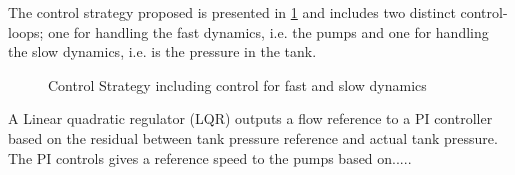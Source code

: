 The control strategy proposed is presented in \cref{fig:tikzControlStrat} and includes two distinct control-loops; one for handling the fast dynamics, i.e. the pumps and one for handling the slow dynamics, i.e. is the pressure in the tank.  
\begin{figure}[h!]
	\centering
	\resizebox{\columnwidth}{!}{
	}
	\caption{Control Strategy including control for fast and slow dynamics}
	\label{fig:tikzControlStrat}
\end{figure}
A Linear quadratic regulator (LQR) outputs a flow reference to a PI controller based on the residual between tank pressure reference and actual tank pressure. The PI controls gives a reference speed to the pumps based on.....

